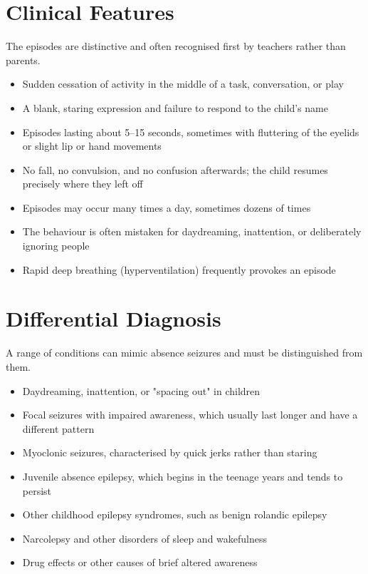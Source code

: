 \section*{Clinical Features}
The episodes are distinctive and often recognised first by teachers rather than parents.

\begin{itemize}
    \item Sudden cessation of activity in the middle of a task, conversation, or play
    \item A blank, staring expression and failure to respond to the child's name
    \item Episodes lasting about 5--15 seconds, sometimes with fluttering of the eyelids or slight lip or hand movements
    \item No fall, no convulsion, and no confusion afterwards; the child resumes precisely where they left off
    \item Episodes may occur many times a day, sometimes dozens of times
    \item The behaviour is often mistaken for daydreaming, inattention, or deliberately ignoring people
    \item Rapid deep breathing (hyperventilation) frequently provokes an episode
\end{itemize}

\section*{Differential Diagnosis}
A range of conditions can mimic absence seizures and must be distinguished from them.

\begin{itemize}
    \item Daydreaming, inattention, or "spacing out" in children
    \item Focal seizures with impaired awareness, which usually last longer and have a different pattern
    \item Myoclonic seizures, characterised by quick jerks rather than staring
    \item Juvenile absence epilepsy, which begins in the teenage years and tends to persist
    \item Other childhood epilepsy syndromes, such as benign rolandic epilepsy
    \item Narcolepsy and other disorders of sleep and wakefulness
    \item Drug effects or other causes of brief altered awareness
\end{itemize}


